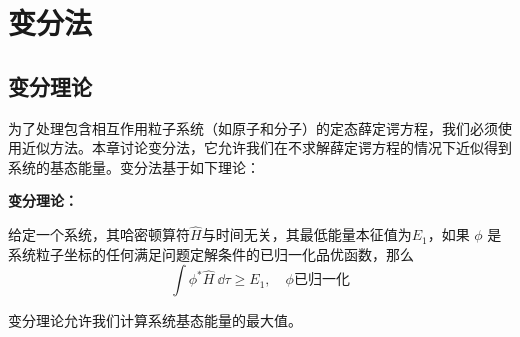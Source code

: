 \chapter{变分法}
\label{chap:8}
\section{变分理论}
\label{sec:8.1 The Variation Theorem}
    为了处理包含相互作用粒子系统（如原子和分子）的定态薛定谔方程，我们必须使用近似方法。本章讨论变分法，它允许我们在不求解薛定谔方程的情况下近似得到系统的基态能量。变分法基于如下理论：
    \begin{center}
        \parbox{0.8\textwidth}{
            \textbf{变分理论：}
            
            给定一个系统，其哈密顿算符$\hat{H}$与时间无关，其最低能量本征值为$E_1$，如果 $\phi$ 是系统粒子坐标的任何满足问题定解条件的已归一化品优函数，那么
            \begin{equation}
                \boxed{
                    \int \phi^{\ast}\hat{H}\:\dd \tau \geq E_1, \quad \phi \text{已归一化}
                }
                \label{eq:8.1}
            \end{equation}
        }
    \end{center}

    变分理论允许我们计算系统基态能量的最大值。

